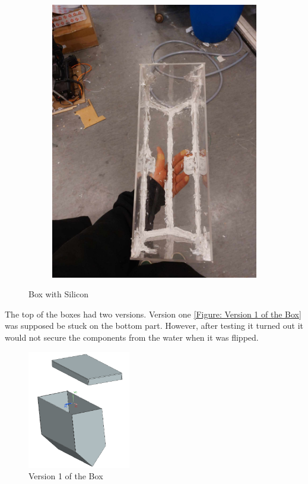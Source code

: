 \begin{figure}[H]
\begin{subfigure}[b]{0.4\textwidth}
        \includegraphics[width=\textwidth]{box_silicon_2.jpg}
    \end{subfigure}
       \caption{Box with Silicon}
       \label{Figure: Box silicon}
\end{figure}
The top of the boxes had two versions. Version one \autoref{Figure: Version 1 of the Box} was supposed be stuck on the bottom part. However, 
after testing it turned out it would not secure the components from the water when it was flipped. 
\begin{figure}[H]
    \centering
    \includegraphics[width=0.4\textwidth]{box_1.png}
    \caption{Version 1 of the Box}
    \label{Figure: Version 1 of the Box}
\end{figure} 
